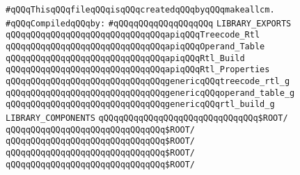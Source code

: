 \label{src/lib/compiler/back/low/lib/rtl.lib}
\verb|#qQQqThisqQQqfileqQQqisqQQqcreatedqQQqbyqQQqmakeallcm.|\newline
\newline
\verb|#qQQqCompiledqQQqby:|\newline
\verb|#qQQqqQQqqQQqqQQqqQQq|\newline
\newline
\verb|LIBRARY_EXPORTS|\newline
\newline
\verb|qQQqqQQqqQQqqQQqqQQqqQQqqQQqqQQqapiqQQqTreecode_Rtl|\newline
\verb|qQQqqQQqqQQqqQQqqQQqqQQqqQQqqQQqapiqQQqOperand_Table|\newline
\verb|qQQqqQQqqQQqqQQqqQQqqQQqqQQqqQQqapiqQQqRtl_Build|\newline
\verb|qQQqqQQqqQQqqQQqqQQqqQQqqQQqqQQqapiqQQqRtl_Properties|\newline
\newline
\verb|qQQqqQQqqQQqqQQqqQQqqQQqqQQqqQQqgenericqQQqtreecode_rtl_g|\newline
\verb|qQQqqQQqqQQqqQQqqQQqqQQqqQQqqQQqgenericqQQqoperand_table_g|\newline
\verb|qQQqqQQqqQQqqQQqqQQqqQQqqQQqqQQqgenericqQQqrtl_build_g|\newline
\newline
\newline
\newline
\verb|LIBRARY_COMPONENTS|\newline
\newline
\verb|qQQqqQQqqQQqqQQqqQQqqQQqqQQqqQQq$ROOT/|\newline
\newline
\verb|qQQqqQQqqQQqqQQqqQQqqQQqqQQqqQQq$ROOT/|\newline
\verb|qQQqqQQqqQQqqQQqqQQqqQQqqQQqqQQq$ROOT/|\newline
\verb|qQQqqQQqqQQqqQQqqQQqqQQqqQQqqQQq$ROOT/|\newline
\verb|qQQqqQQqqQQqqQQqqQQqqQQqqQQqqQQq$ROOT/|\newline
